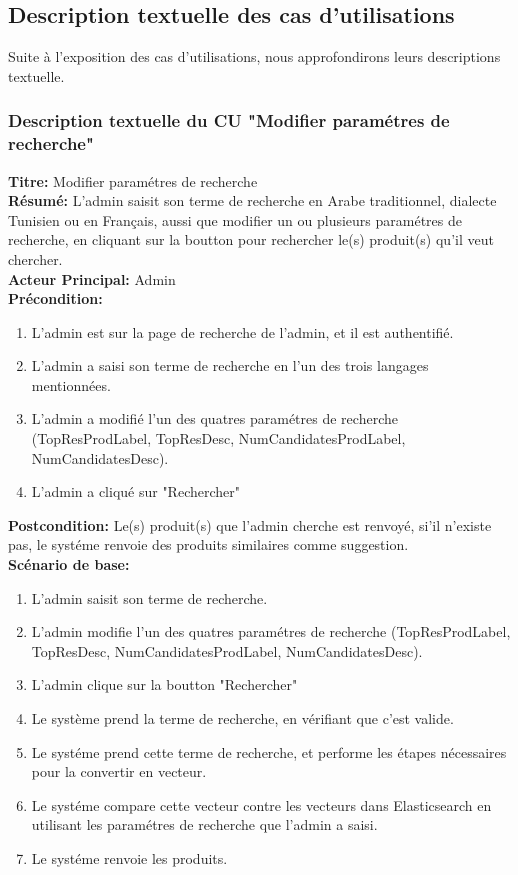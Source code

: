 \subsection{Description textuelle des cas d'utilisations}
\noindent
Suite à l'exposition des cas d'utilisations, nous approfondirons leurs descriptions textuelle.

\subsubsection{Description textuelle du CU "Modifier paramétres de recherche"}
\noindent
\textbf{Titre:} Modifier paramétres de recherche \\
\textbf{Résumé:} L'admin saisit son terme de recherche en Arabe traditionnel, dialecte Tunisien ou en Français, aussi que modifier un ou plusieurs paramétres de recherche, en cliquant sur la boutton pour rechercher le(s) produit(s) qu'il veut chercher. \\
\textbf{Acteur Principal:} Admin \\
\textbf{Précondition:} \begin{enumerate}
	\item L'admin est sur la page de recherche de l'admin, et il est authentifié.
	\item L'admin a saisi son terme de recherche en l'un des trois langages mentionnées.
	\item L'admin a modifié l'un des quatres paramétres de recherche (TopResProdLabel, TopResDesc, NumCandidatesProdLabel, NumCandidatesDesc).
	\item L'admin a cliqué sur "Rechercher"
\end{enumerate}
\textbf{Postcondition:} Le(s) produit(s) que l'admin cherche est renvoyé, si'il n'existe pas, le systéme renvoie des produits similaires comme suggestion. \\
\textbf{Scénario de base: }
\begin{enumerate}
	\item L'admin saisit son terme de recherche.
	\item L'admin modifie l'un des quatres paramétres de recherche (TopResProdLabel, TopResDesc, NumCandidatesProdLabel, NumCandidatesDesc).
	\item L'admin clique sur la boutton "Rechercher"
	\item Le système prend la terme de recherche, en vérifiant que c'est valide.
	\item Le systéme prend cette terme de recherche, et performe les étapes nécessaires pour la convertir en vecteur.
	\item Le systéme compare cette vecteur contre les vecteurs dans Elasticsearch en utilisant les paramétres de recherche que l'admin a saisi.
	\item Le systéme renvoie les produits.
\end{enumerate}

